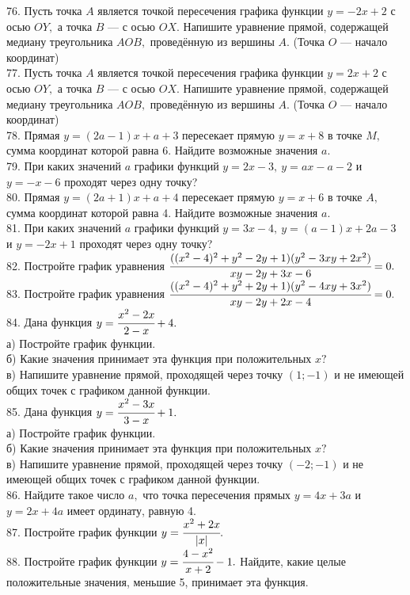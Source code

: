 \documentclass[12pt]{article}
\begin{document}
76. Пусть точка $A$ является точкой пересечения графика функции $y=-2x+2$ с осью $OY,$ а точка $B$ --- с осью $OX.$ Напишите уравнение прямой, содержащей медиану треугольника $AOB,$ проведённую из вершины $A.$ (Точка $O$ --- начало координат)\\
77. Пусть точка $A$ является точкой пересечения графика функции $y=2x+2$ с осью $OY,$ а точка $B$ --- с осью $OX.$ Напишите уравнение прямой, содержащей медиану треугольника $AOB,$ проведённую из вершины $A.$ (Точка $O$ --- начало координат)\\
78. Прямая $y=(2a-1)x+a+3$ пересекает прямую $y=x+8$ в точке $M,$ сумма координат которой равна 6. Найдите возможные значения $a.$\\
79. При каких значений $a$ графики функций $y=2x-3,\ y=ax-a-2$ и $y=-x-6$ проходят через одну точку?\\
80. Прямая $y=(2a+1)x+a+4$ пересекает прямую $y=x+6$ в точке $A,$ сумма координат которой равна 4. Найдите возможные значения $a.$\\
81. При каких значений $a$ графики функций $y=3x-4,\ y=(a-1)x+2a-3$ и $y=-2x+1$ проходят через одну точку?\\
82. Постройте график уравнения $\cfrac{((x^2-4)^2+y^2-2y+1)(y^2-3xy+2x^2)}{xy-2y+3x-6}=0.$\\
83. Постройте график уравнения $\cfrac{((x^2-4)^2+y^2+2y+1)(y^2-4xy+3x^2)}{xy-2y+2x-4}=0.$\\
84. Дана функция $y=\cfrac{x^2-2x}{2-x}+4.$\\
а) Постройте график функции.\\
б) Какие значения принимает эта функция при положительных $x?$\\
в) Напишите уравнение прямой, проходящей через точку $(1;-1)$ и не имеющей общих точек с графиком данной функции.\\
85. Дана функция $y=\cfrac{x^2-3x}{3-x}+1.$\\
а) Постройте график функции.\\
б) Какие значения принимает эта функция при положительных $x?$\\
в) Напишите уравнение прямой, проходящей через точку $(-2;-1)$ и не имеющей общих точек с графиком данной функции.\\
86. Найдите такое число $a,$ что точка пересечения прямых $y=4x+3a$ и $y=2x+4a$ имеет ординату, равную 4.\\
87. Постройте график функции $y=\cfrac{x^2+2x}{|x|}.$\\
88. Постройте график функции $y=\cfrac{4-x^2}{x+2}-1.$ Найдите, какие целые положительные значения, меньшие 5, принимает эта функция.\\
\end{document}
